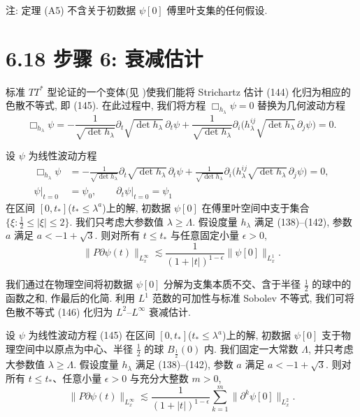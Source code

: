 注: 定理 (A5) 不含关于初数据 $\psi[0]$ 傅里叶支集的任何假设.
\section*{6.18 步骤 6: 衰减估计}

标准 $TT^*$ 型论证的一个变体(见 \cite{klai29})使我们能将 Strichartz 估计 (144) 化归为相应的色散不等式, 即 (145). 在此过程中, 我们将方程 $\Box_{h_\lambda}\psi=0$ 替换为几何波动方程
\begin{equation}
\Box_{h_\lambda}\psi=-\frac{1}{\sqrt{\det h_\lambda}}\partial_t\sqrt{\det h_\lambda}\,\partial_t\psi+\frac{1}{\sqrt{\det h_\lambda}}\partial_i\bigl(h_\lambda^{ij}\sqrt{\det h_\lambda}\,\partial_j\psi\bigr)=0.\end{equation}

\setcounter{mtthm}{18}%

\begin{theorem}[A6]\label{thm:6.19}
设 $\psi$ 为线性波动方程
\begin{equation}
\begin{aligned}
\Box_{h_\lambda}\psi&=-\frac{1}{\sqrt{\det h_\lambda}}\partial_t\sqrt{\det h_\lambda}\,\partial_t\psi+\frac{1}{\sqrt{\det h_\lambda}}\partial_i\bigl(h^{ij}_\lambda\sqrt{\det h_\lambda}\,\partial_j\psi\bigr)=0,\\
\psi|_{t=0}&=\psi_0,\qquad \partial_t\psi|_{t=0}=\psi_1
\end{aligned}
\end{equation}
在区间 $[0,t_*]$($t_*\leq\lambda^a$)上的解, 初数据 $\psi[0]$ 在傅里叶空间中支于集合 $\{\xi:\frac12\leq|\xi|\leq 2\}$. 我们只考虑大参数值 $\lambda\geq\Lambda$. 假设度量 $h_\lambda$ 满足 (138)--(142), 参数 $a$ 满足 $a<-1+\sqrt3$. 则对所有 $t\leq t_*$ 与任意固定小量 $\epsilon>0$,
\begin{equation}
\|P\partial\psi(t)\|_{L_x^\infty}\lesssim\frac{1}{(1+|t|)^{1-\epsilon}}\|\psi[0]\|_{L_x^1}.\end{equation}
\end{theorem}

我们通过在物理空间将初数据 $\psi[0]$ 分解为支集本质不交、含于半径 $\frac12$ 的球中的函数之和, 作最后的化简. 利用 $L^1$ 范数的可加性与标准 Sobolev 不等式, 我们可将色散不等式 (146) 化归为 $L^2$--$L^\infty$ 衰减估计.
\begin{theorem}[B]\label{thm:6.20}
设 $\psi$ 为线性波动方程 (145) 在区间 $[0,t_*]$($t_*\leq\lambda^a$)上的解, 初数据 $\psi[0]$ 支于物理空间中以原点为中心、半径 $\frac12$ 的球 $B_{\frac12}(0)$ 内. 我们固定一大常数 $\Lambda$, 并只考虑大参数值 $\lambda\geq\Lambda$. 假设度量 $h_\lambda$ 满足 (138)--(142), 参数 $a$ 满足 $a<-1+\sqrt3$. 则对所有 $t\leq t_*$、任意小量 $\epsilon>0$ 与充分大整数 $m>0$,
\begin{equation}
\|P\partial\psi(t)\|_{L_x^\infty}\lesssim\frac{1}{(1+|t|)^{1-\epsilon}}\sum_{k=1}^m\|\partial^k\psi[0]\|_{L_x^2}.\end{equation}
\end{theorem}
